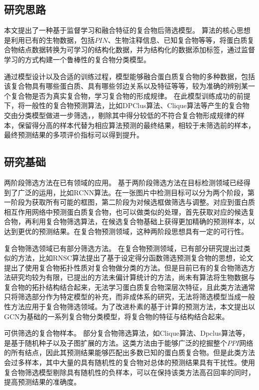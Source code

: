 \subsection{研究思路}
\label{subsection:motivationAndThinking:thinking}

本文提出了一种基于监督学习和融合特征的复合物后筛选模型。
算法的核心思想是利用已有的生物数据，包括$PIN$、生物注释信息、已知复合物等等，将蛋白质复合物结点数据转换为可学习的结构化数据，并为结构化的数据添加标签，通过监督学习的方式构建一个鲁棒性的复合物分类模型。

通过模型设计以及合适的训练过程，模型能够融合蛋白质复合物的多种数据，包括该复合物具有哪些蛋白质、具有哪些邻边关系以及特征等等，较为准确的辨别某一个复合物是否为真实复合物，学习复合物的形成规律。
在此模型训练成功的前提下，将一般性的复合物预测算法，比如DPClus算法\cite{altaf-ul-amin_development_2006}、Clique算法\cite{spirin_protein_2003}等产生的复合物交由分类模型做进一步筛选，，剔除其中得分较低的不符合复合物形成规律的样本，保留得分高的样本代替为相应算法预测的最终结果，相较于未筛选前的样本，最终预测结果的多项评价指标可以得到提升。

\subsection{研究基础}
\label{subsection:motivationAndThinking:datasubstructure}

两阶段筛选方法在已有领域的应用。
基于两阶段筛选方法在目标检测领域已经得到了广泛的运用，比如RCNN算法\cite{girshick_rich_2014}。在一张图片中检测目标可以分为两个阶段，第一阶段为获取所有可能的框图，第二阶段为对候选框做筛选与调整。对应到蛋白质相互作用网络中预测蛋白质复合物，也可以做类似的处理，首先获取对应的候选复合物，再利用复合物筛选算法，在候选复合物基础上获得更加精确的预测样本，以达到更优的预测结果。在复合物预测领域，这种两阶段思想具有一定的可行性。

复合物筛选领域已有部分筛选方法。
在复合物预测领域，已有部分研究提出过类似的方法，比如RNSC算法\cite{king_protein_2004}提出了基于设定得分函数筛选预测复合物的思想，论文\cite{yu_predicting_2014}提出了使用复合物拓扑性质对复合物做分类的方法。但是目前已有的复合物筛选方法研究均较为有限，已提出的方法未偏计算统计的方法，尚未有算法将生物数据与复合物的拓扑结构结合起来，无法学习蛋白质复合物深层次特征，且此类方法通常只将筛选部分作为特定模型的补充，而非成体系的研究，无法将筛选模型当成一般性方法应用于复合物筛选领域。为了改进朴素的基于计算的预测方法，本文提出以GCN为基础的一系列复合物分类模型，将复合物的特征与结构结合起来。

可供筛选的复合物样本。
部分复合物筛选算法，如Clique算法\cite{spirin_protein_2003}、Dpclus算法等，是基于随机种子以及子图扩展的方法。这类方法由于能够广泛的挖掘整个$PPI$网络的所有结点，因此其预测结果能够匹配出多数已知的蛋白质复合物。但是此类方法会过多样本，其中大量的具有随机性的复合物对总体的预测结果具有干扰性。使用复合物筛选模型剔除具有随机性的负样本，可以在保持该类方法高召回率的同时，提高预测结果的准确度。


